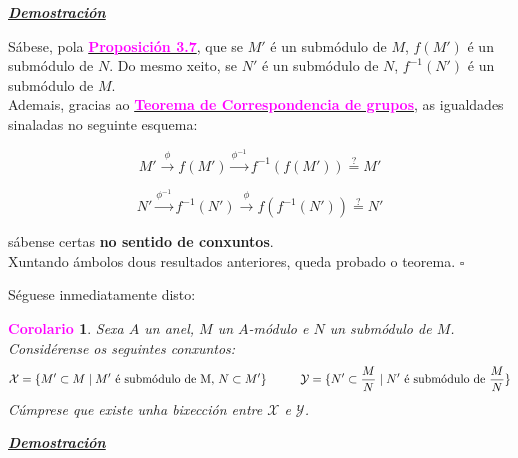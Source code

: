\documentclass[twoside]{report}
\newcommand{\magbf}[1]{\textcolor{magenta}{\textbf{#1}}} %
\theoremstyle{mystyle}
\newtheorem{cor}{\magbf{Corolario}}[chapter]
\newenvironment{corollary}
{\begin{mdframed}[linecolor = magenta,backgroundcolor = classicrose, linewidth = 2mm]\begin{cor}}
{\end{cor}\end{mdframed}}
\begin{document}
\vspace{2mm}

\noindent \textbf{\textit{\underline{Demostración}}}

\vspace{2mm}

\noindent Sábese, pola \hyperref[prop3.7]{\magbf{Proposición 3.7}}, que se $M'$ é un submódulo de $M$, $f(M')$ é un submódulo de $N$. Do mesmo xeito, se $N'$ é un submódulo de $N$, $f^{-1}(N')$ é un submódulo de $M$.\\

\noindent Ademais, gracias ao \hyperref[th1.8]{\magbf{Teorema de Correspondencia de grupos}}, as igualdades sinaladas no seguinte esquema:

$$ M' \overset{\phi}{\longrightarrow} f(M') \overset{\phi^{-1}}{\longrightarrow} f^{-1}(f(M')) \overset{?}{=} M' $$

$$ N' \overset{\phi^{-1}}{\longrightarrow} f^{-1}(N') \overset{\phi}{\longrightarrow} f(f^{-1}(N')) \overset{?}{=} N'$$

\noindent sábense certas \textbf{no sentido de conxuntos}.\\

\noindent Xuntando ámbolos dous resultados anteriores, queda probado o teorema. $\square$\\

\vspace{3mm}

\noindent Séguese inmediatamente disto:

\begin{corollary} \label{cor3.2}
Sexa $A$ un anel, $M$ un $A$-módulo e $N$ un submódulo de $M$. Considérense os seguintes conxuntos:
$$\mathcal{X} = \{M' \subset M \hspace{1mm} | \hspace{1mm} M' \text{ é submódulo de M, } N \subset M'\} \hspace{10mm} \mathcal{Y}= \{ N' \subset \displaystyle \frac{M}{N} \hspace{1mm} | \hspace{1mm} N' \text{ é submódulo de } \displaystyle \frac{M}{N}\}$$
\noindent Cúmprese que existe unha bixección entre $\mathcal{X}$ e $\mathcal{Y}$.
\end{corollary}

\vspace{2mm}

\noindent \textbf{\textit{\underline{Demostración}}}

\vspace{2mm}
\end{document}
